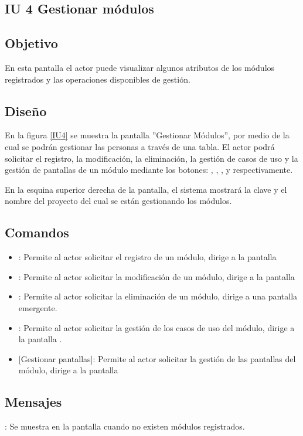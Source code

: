 \subsection{IU 4 Gestionar módulos}

\subsection{Objetivo}
	En esta pantalla el actor puede visualizar algunos atributos de los módulos registrados y las operaciones disponibles de gestión.
\subsection{Diseño}
	En la figura \ref{IU4} se muestra la pantalla ''Gestionar Módulos'', por medio de la cual se podrán gestionar las personas a través de una tabla. El actor podrá solicitar el registro, la modificación, la eliminación, la gestión de casos de uso y la gestión de pantallas de un módulo mediante los botones: , \editar, \eliminar, {\UCsist } y  respectivamente.
	
	En la esquina superior derecha de la pantalla, el sistema mostrará la clave y el nombre del proyecto del cual se están gestionando los módulos.

\label{IU4}
\subsection{Comandos}
\begin{itemize}
	\item {}: Permite al actor solicitar el registro de un módulo, dirige a la pantalla 
	\item \editar [Modificar]: Permite al actor solicitar la modificación de un módulo, dirige a la pantalla 
	\item \eliminar [Eliminar]: Permite al actor solicitar la eliminación de un módulo, dirige a una pantalla emergente.
	\item {}: Permite al actor solicitar la gestión de los casos de uso del módulo, dirige a la pantalla .
	\item {} [Gestionar pantallas]: Permite al actor solicitar la gestión de las pantallas del módulo, dirige a la pantalla 
\end{itemize}

\subsection{Mensajes}

\begin{Citemize}
	\item {}: Se muestra en la pantalla  cuando no existen módulos registrados.
\end{Citemize}
